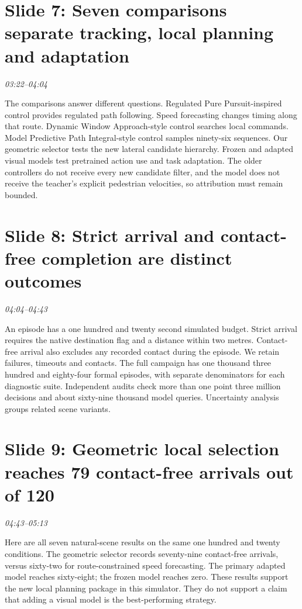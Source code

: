 \documentclass[a4paper,11pt]{article}
\begin{document}
\section*{Slide 7: Seven comparisons separate tracking, local planning and adaptation}
\textit{03:22--04:04}

The comparisons answer different questions. Regulated Pure Pursuit-inspired control provides regulated path following. Speed forecasting changes timing along that route. Dynamic Window Approach-style control searches local commands. Model Predictive Path Integral-style control samples ninety-six sequences. Our geometric selector tests the new lateral candidate hierarchy. Frozen and adapted visual models test pretrained action use and task adaptation. The older controllers do not receive every new candidate filter, and the model does not receive the teacher's explicit pedestrian velocities, so attribution must remain bounded.

\section*{Slide 8: Strict arrival and contact-free completion are distinct outcomes}
\textit{04:04--04:43}

An episode has a one hundred and twenty second simulated budget. Strict arrival requires the native destination flag and a distance within two metres. Contact-free arrival also excludes any recorded contact during the episode. We retain failures, timeouts and contacts. The full campaign has one thousand three hundred and eighty-four formal episodes, with separate denominators for each diagnostic suite. Independent audits check more than one point three million decisions and about sixty-nine thousand model queries. Uncertainty analysis groups related scene variants.

\section*{Slide 9: Geometric local selection reaches 79 contact-free arrivals out of 120}
\textit{04:43--05:13}

Here are all seven natural-scene results on the same one hundred and twenty conditions. The geometric selector records seventy-nine contact-free arrivals, versus sixty-two for route-constrained speed forecasting. The primary adapted model reaches sixty-eight; the frozen model reaches zero. These results support the new local planning package in this simulator. They do not support a claim that adding a visual model is the best-performing strategy.
\end{document}
